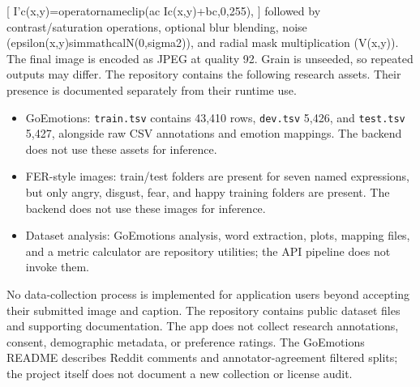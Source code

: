 \documentclass[conference]{IEEEtran}
\begin{document}
{}[\markdownRendererSoftLineBreak
{}I'\markdownRendererUnderscore{}c(x,y)=\markdownRendererBackslash{}operatorname\markdownRendererLeftBrace{}clip\markdownRendererRightBrace{}(a\markdownRendererUnderscore{}c I\markdownRendererUnderscore{}c(x,y)+b\markdownRendererUnderscore{}c,0,255),\markdownRendererSoftLineBreak
{}]\markdownRendererParagraphSeparator
{}followed by contrast/saturation operations, optional blur blending, noise (\markdownRendererBackslash{}epsilon(x,y)\markdownRendererBackslash{}sim\markdownRendererBackslash{}mathcal\markdownRendererLeftBrace{}N\markdownRendererRightBrace{}(0,\markdownRendererBackslash{}sigma\markdownRendererCircumflex{}2)), and radial mask multiplication (V(x,y)). The final image is encoded as JPEG at quality 92. Grain is unseeded, so repeated outputs may differ.\markdownRendererInterblockSeparator
{}
\markdownRendererSectionEnd 
\markdownRendererSectionEnd \markdownRendererSectionBegin
{}\markdownRendererInterblockSeparator
{}\markdownRendererSectionBegin
{}\markdownRendererInterblockSeparator
{}The repository contains the following research assets. Their presence is documented separately from their runtime use.\markdownRendererInterblockSeparator
\begin{itemize}
\item GoEmotions: \texttt{train.tsv} contains 43,410 rows, \texttt{dev.tsv} 5,426, and \texttt{test.tsv} 5,427, alongside raw CSV annotations and emotion mappings. The backend does not use these assets for inference.
\item FER-style images: train/test folders are present for seven named expressions, but only angry, disgust, fear, and happy training folders are present. The backend does not use these images for inference.
\item Dataset analysis: GoEmotions analysis, word extraction, plots, mapping files, and a metric calculator are repository utilities; the API pipeline does not invoke them.
\end{itemize}\par\markdownRendererInterblockSeparator
{}\markdownRendererSectionEnd \markdownRendererSectionBegin
{}\markdownRendererInterblockSeparator
{}No data-collection process is implemented for application users beyond accepting their submitted image and caption. The repository contains public dataset files and supporting documentation. The app does not collect research annotations, consent, demographic metadata, or preference ratings. The GoEmotions README describes Reddit comments and annotator-agreement filtered splits; the project itself does not document a new collection or license audit.\markdownRendererInterblockSeparator
\end{document}
